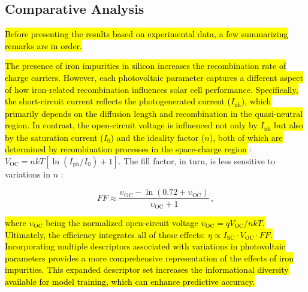 \documentclass[a4paper,fleqn,draft]{cas-sc}
\begin{document}
\begin{tcolorbox}
\textcolor[rgb]{1.00,0.07,0.00}{
\subsection{Comparative Analysis}
}\end{tcolorbox}

\textcolor[rgb]{1.00,0.07,0.00}{
\hl{
Before presenting the results based on experimental data, a few summarizing remarks are in order.
}}

\textcolor[rgb]{1.00,0.07,0.00}{
\hl{
The presence of iron impurities in silicon increases the recombination rate of charge carriers.
However, each photovoltaic parameter captures a different aspect of how iron-related recombination influences solar cell performance.
Specifically, the short-circuit current reflects the photogenerated current ($I_\mathrm{ph}$),
which primarily depends on the diffusion length and recombination in the quasi-neutral region.
In contrast, the open-circuit voltage is influenced not only by $I_\mathrm{ph}$ but also by the saturation current ($I_0$)
and the ideality factor ($n$), both of which are determined by recombination processes in the space-charge region} \cite{YangHandbookPVSi}:
$ V_\mathrm{OC} = nkT\left[ {\ln\left( {I_\mathrm{ph}/{I_0}} \right)+1} \right]$.
The fill factor, in turn, is less sensitive to variations in $n$ \cite{Green1982}:
}

\begin{tcolorbox}
\textcolor[rgb]{1.00,0.07,0.00}{
\begin{equation}
\label{eqFF2}
    F\!F \approx \frac{\upsilon_\mathrm{OC}-\ln\left(0.72+\upsilon_\mathrm{OC}\right)}{\upsilon_\mathrm{OC}+1} \,,
\end{equation}
}
\end{tcolorbox}
\textcolor[rgb]{1.00,0.07,0.00}{
\hl{
where
$\upsilon_\mathrm{OC}$ being the normalized open-circuit voltage
$\upsilon_\mathrm{OC}=qV_\mathrm{OC}/nkT$.
Ultimately, the efficiency integrates all of these effects: $\eta \propto I_\mathrm{SC}\cdot V_\mathrm{OC}\cdot F\!F$.
Incorporating multiple descriptors associated with variations in photovoltaic parameters provides
a more comprehensive representation of the effects of iron impurities.
This expanded descriptor set increases the informational diversity available for model training, which can enhance predictive accuracy. 
}}
\end{document}
